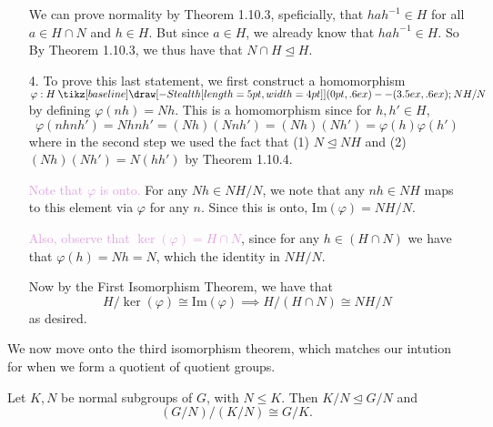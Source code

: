 \documentclass[12pt,letterpaper]{algebra_book}
\renewcommand{\to}{\mathbin{\tikz[baseline] \draw[-{Stealth[length=5pt,width=4pt]}] (0pt,.6ex) -- (3.5ex,.6ex);}}
\newcommand{\normal}{\unlhd}
\newcommand{\im}{\mbox{Im}}
\renewcommand{\phi}{\varphi}
\theoremstyle{definition}
\begin{document}
\begin{prf}
\begin{itemize}
            We can prove
            normality by Theorem 1.10.3, speficially, that $hah^{-1}
            \in H$ for all $a \in
            H \cap N$ and $h \in H$. But since $a \in H$,
            we already know that $hah^{-1} \in H$. So 
            By Theorem 1.10.3, we
            thus have that $N \cap H \normal H$.

            \item[4.] \textcolor{NavyBlue}{To prove this last statement, we first construct
            a homomorphism $\phi: H \to NH/N$ by defining $\phi(nh) =
            Nh$.} This is a homomorphism since for $h, h' \in H$,
            \[
                \phi(nhnh') = Nhnh' = (Nh)(Nnh') = (Nh)(Nh') = \phi(h)\phi(h')
            \]
            where in the second step we used the fact that (1) $N
            \normal NH$ and (2) $(Nh)(Nh') = N(hh')$ by Theorem 1.10.4.
            
            \textcolor{Plum}{Note that $\phi$ is onto.} For any $Nh \in NH/N$, we note
            that any $nh \in NH$ maps to this element via $\phi$ for
            any $n$. Since this is onto, $\im(\phi) = NH/N$. 

            \textcolor{Plum}{Also, observe that $\ker(\phi) = H \cap N$}, since for any
            $h \in (H \cap N)$ we have that $\phi(h) = Nh = N$, which
            the identity in $NH/N$.

            Now by the First Isomorphism Theorem, we have that 
            \[
                H/\ker(\phi) \cong \im(\phi) \implies H/(H \cap N) \cong NH/N
            \]
            as desired.
        \end{itemize}
    \end{prf}

    We now move onto the third isomorphism theorem, which matches our
    intution for when we form a quotient of quotient groups.

    \begin{thm}
        Let $K, N$ be normal subgroups of $G$, with $N \le K$.
        Then $K/N \normal G/N$ and 
        \[
            (G/N)/(K/N) \cong G/K.   
        \]
        \vspace{-0.5cm}
    \end{thm}
    
\end{document}
